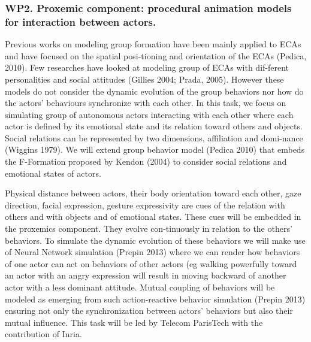 

\subsubsection{WP2. Proxemic component: procedural animation models for interaction between actors.}

Previous works on modeling group formation have been mainly applied to ECAs and have focused on the spatial posi-tioning and orientation of the ECAs (Pedica, 2010). Few researches have looked at modeling group of ECAs with dif-ferent personalities and social attitudes (Gillies 2004; Prada, 2005). However these models do not consider the dynamic evolution of the group behaviors nor how do the actors' behaviours synchronize with each other. In this task, we focus on simulating group of autonomous actors interacting with each other where each actor is defined by its emotional state and its relation toward others and objects. Social relations can be represented by two dimensions, affiliation and domi-nance (Wiggins 1979). We will extend group behavior model (Pedica 2010) that embeds the F-Formation proposed by Kendon (2004) to consider social relations and emotional states of actors. 

Physical distance between actors, their body orientation toward each other, gaze direction, facial expression, gesture expressivity are cues of the relation with others and with objects and of emotional states. These cues will be embedded in the proxemics component. They evolve con-tinuously in relation to the others' behaviors. To simulate the dynamic evolution of these behaviors we will make use of Neural Network simulation (Prepin 2013) where we can render how behaviors of one actor can act on behaviors of other actors (eg walking powerfully toward an actor with an angry expression will result in moving backward of another actor with a less dominant attitude. Mutual coupling of behaviors will be modeled as emerging from such action-reactive behavior simulation (Prepin 2013) ensuring not only the synchronization between actors' behaviors but also their mutual influence. This task will be led by Telecom ParisTech with the contribution of Inria.



\endinput